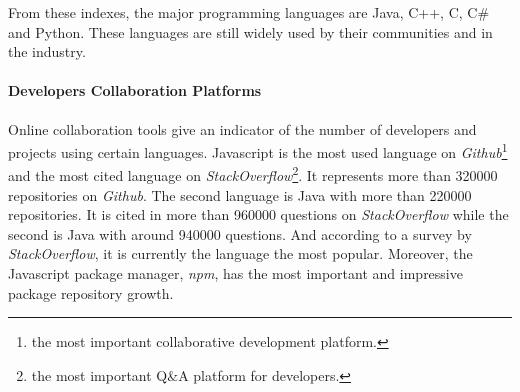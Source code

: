 From these indexes, the major programming languages are Java, C++, C, C\# and Python.
These languages are still widely used by their communities and in the industry.

\begin{figure}[h!]
\end{figure}

\paragraph{Developers Collaboration Platforms}

Online collaboration tools give an indicator of the number of developers and projects using certain languages.
Javascript is the most used language on \textit{Github}\footnote{the most important collaborative development platform.} and the most cited language on \textit{StackOverflow}\footnote{the most important Q\&A platform for developers.}.
It represents more than \num{320000} repositories on \textit{Github}.
The second language is Java with more than \num{220000} repositories.
It is cited in more than \num{960000} questions on \textit{StackOverflow} while the second is Java with around \num{940000} questions.
And according to a survey by \textit{StackOverflow}, it is currently the language the most popular.
Moreover, the Javascript package manager, \textit{npm}, has the most important and impressive package repository growth.

\begin{figure}[h!]
\end{figure}

